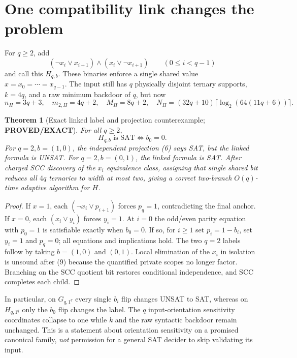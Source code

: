 \documentclass[11pt]{article}
\newtheorem{theorem}{Theorem}
\newcommand{\PROVED}{\textbf{PROVED/EXACT}}
\begin{document}
\section{One compatibility link changes the problem}
For $q\ge2$, add
\[
(\neg x_i\vee x_{i+1})
\land(x_i\vee\neg x_{i+1})
\qquad(0\le i<q-1)
\tag{9}
\]
and call this $H_{q,b}$. These binaries enforce a
single shared value $x=x_0=\cdots=x_{q-1}$.
The input still has $q$ physically disjoint ternary
supports, $k=4q$, and a raw minimum backdoor of $q$,
but now
\[
n_H=3q+3,\quad m_{2,H}=4q+2,\quad
M_H=8q+2,\quad
N_H=(32q+10)\lceil\log_2(64(11q+6))\rceil.
\tag{10}
\]
\begin{theorem}[Exact linked label and projection counterexample;
\PROVED]\label{th:link}
For all $q\ge2$,
\[
H_{q,b}\text{ is SAT}\iff b_0=0.
\tag{11}
\]
For $q=2,b=(1,0)$, the independent projection (6) says
SAT, but the linked formula is UNSAT.
For $q=2,b=(0,1)$, the linked formula is SAT.
After charged SCC discovery of the $x_i$ equivalence
class, assigning that single shared bit reduces all
$4q$ ternaries to width at most two, giving a correct
two-branch $O(q)$-time adaptive algorithm for $H$.
\end{theorem}
\begin{proof}
If $x=1$, each $(\neg x_i\vee p_{i+1})$
forces $p_q=1$, contradicting the final anchor.
If $x=0$, each $(x_i\vee y_i)$ forces $y_i=1$.
At $i=0$ the odd/even parity equation with $p_0=1$
is satisfiable exactly when $b_0=0$. If so, for
$i\ge1$ set $p_i=1-b_i$, set $y_i=1$ and
$p_q=0$; all equations and implications hold.
The two $q=2$ labels follow by taking $b=(1,0)$
and $(0,1)$. Local elimination of the $x_i$ in
isolation is unsound after (9) because the quantified
private scopes no longer factor. Branching on the
SCC quotient bit restores conditional independence,
and SCC completes each child.
\end{proof}
In particular, on $G_{q,1^q}$ every single $b_i$ flip
changes UNSAT to SAT, whereas on $H_{q,1^q}$ only the
$b_0$ flip changes the label. The $q$ input-orientation
sensitivity coordinates collapse to one while
$k$ and the raw syntactic backdoor remain unchanged.
This is a statement about orientation sensitivity on
a promised canonical family, \emph{not} permission for
a general SAT decider to skip validating its input.
\end{document}
